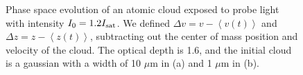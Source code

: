 \documentclass[12pt]{iopart}
\begin{document}
\begin{figure}
\caption{Phase space evolution of an atomic cloud exposed to probe light with intensity $I_0=1.2 I_{\rm{sat}}$. We defined $\Delta v=v -\left< v(t) \right>$  and $\Delta z=z-\left< z(t) \right>$, subtracting out the center of mass position and velocity of the cloud. The optical depth is 1.6, and the initial cloud is a gaussian with a width of 10 $\mu$m in (a) and 1 $\mu$m in (b).}  
\label{fig:phaseSpace}
\end{figure}
\end{document}
